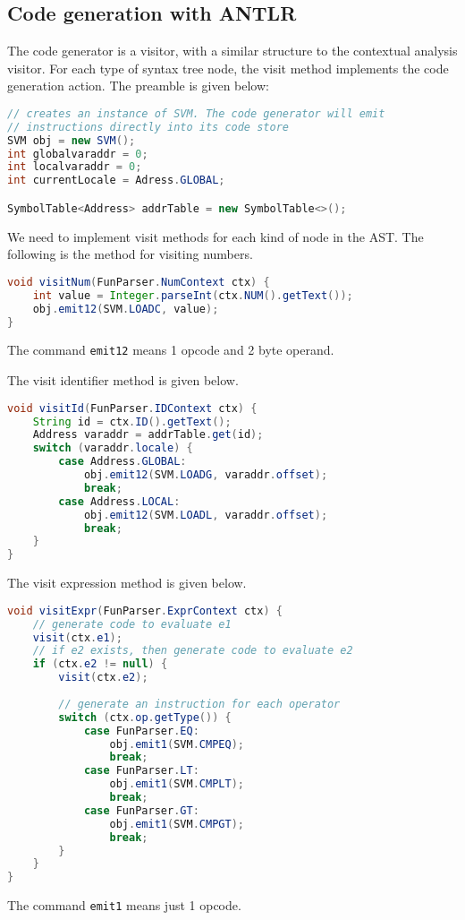 \documentclass[a4paper, openany]{memoir}
\begin{document}
\subsection{Code generation with ANTLR}
The code generator is a visitor, with a similar structure to the contextual analysis visitor. For each type of syntax tree node, the visit method implements the code generation action. The preamble is given below:
\begin{lstlisting}[language=java]
// creates an instance of SVM. The code generator will emit
// instructions directly into its code store
SVM obj = new SVM();
int globalvaraddr = 0;
int localvaraddr = 0;
int currentLocale = Adress.GLOBAL;

SymbolTable<Address> addrTable = new SymbolTable<>();
\end{lstlisting}

We need to implement visit methods for each kind of node in the AST. The following is the method for visiting numbers.
\begin{lstlisting}[language=java]
void visitNum(FunParser.NumContext ctx) {
    int value = Integer.parseInt(ctx.NUM().getText());
    obj.emit12(SVM.LOADC, value);
}
\end{lstlisting}
The command \texttt{emit12} means 1 opcode and 2 byte operand. 

The visit identifier method is given below.
\begin{lstlisting}[language=java]
void visitId(FunParser.IDContext ctx) {
    String id = ctx.ID().getText();
    Address varaddr = addrTable.get(id);
    switch (varaddr.locale) {
        case Address.GLOBAL:
            obj.emit12(SVM.LOADG, varaddr.offset);
            break;
        case Address.LOCAL:
            obj.emit12(SVM.LOADL, varaddr.offset);
            break;
    }
}
\end{lstlisting}

The visit expression method is given below.
\begin{lstlisting}[language=java]
void visitExpr(FunParser.ExprContext ctx) {
    // generate code to evaluate e1
    visit(ctx.e1);
    // if e2 exists, then generate code to evaluate e2
    if (ctx.e2 != null) {
        visit(ctx.e2);
        
        // generate an instruction for each operator
        switch (ctx.op.getType()) {
            case FunParser.EQ:
                obj.emit1(SVM.CMPEQ);
                break;
            case FunParser.LT:
                obj.emit1(SVM.CMPLT);
                break;
            case FunParser.GT:
                obj.emit1(SVM.CMPGT);
                break;
        }
    }
}
\end{lstlisting}
The command \texttt{emit1} means just 1 opcode.
\end{document}

